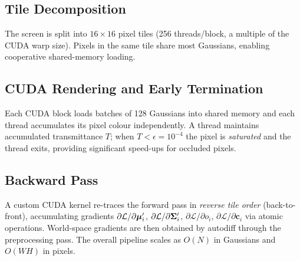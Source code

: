 \subsection{Tile Decomposition}

The screen is split into $16\times16$ pixel tiles (256 threads/block, a
multiple of the CUDA warp size). Pixels in the same tile share most Gaussians,
enabling cooperative shared-memory loading.

\subsection{CUDA Rendering and Early Termination}

Each CUDA block loads batches of 128 Gaussians into shared memory and each
thread accumulates its pixel colour independently. A thread maintains
accumulated transmittance $T$; when $T < \epsilon = 10^{-4}$ the pixel is
\emph{saturated} and the thread exits, providing significant speed-ups for
occluded pixels.

\subsection{Backward Pass}

A custom CUDA kernel re-traces the forward pass in \emph{reverse tile order}
(back-to-front), accumulating gradients
$\partial\mathcal{L}/\partial\boldsymbol{\mu}'_i$,
$\partial\mathcal{L}/\partial\boldsymbol{\Sigma}'_i$,
$\partial\mathcal{L}/\partial o_i$,
$\partial\mathcal{L}/\partial\mathbf{c}_i$
via atomic operations. World-space gradients are then obtained by autodiff
through the preprocessing pass. The overall pipeline scales as $O(N)$ in
Gaussians and $O(WH)$ in pixels.
